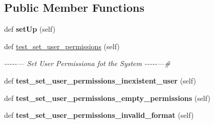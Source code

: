 \subsection*{Public Member Functions}
\begin{DoxyCompactItemize}
\item 
\mbox{\label{classtests_1_1test__11__user__set__permissions_1_1_test_user_routes_a5ea7fb6069f63faa57c138d73a687d7c}} 
def {\bfseries set\+Up} (self)
\item 
\mbox{\label{classtests_1_1test__11__user__set__permissions_1_1_test_user_routes_aeccf827afa3d453bc46799a18600bd29}} 
def \hyperlink{classtests_1_1test__11__user__set__permissions_1_1_test_user_routes_aeccf827afa3d453bc46799a18600bd29}{test\+\_\+set\+\_\+user\+\_\+permissions} (self)
\begin{DoxyCompactList}\small\item\em -\/-\/-\/-\/-\/--- Set User Permissiona fot the System -\/-\/-\/-\/-\/---\# \end{DoxyCompactList}\item 
\mbox{\label{classtests_1_1test__11__user__set__permissions_1_1_test_user_routes_abd6a4f49a136ac51321371ec480348bb}} 
def {\bfseries test\+\_\+set\+\_\+user\+\_\+permissions\+\_\+inexistent\+\_\+user} (self)
\item 
\mbox{\label{classtests_1_1test__11__user__set__permissions_1_1_test_user_routes_a98fc5eed433235fbb33160c459943078}} 
def {\bfseries test\+\_\+set\+\_\+user\+\_\+permissions\+\_\+empty\+\_\+permissions} (self)
\item 
\mbox{\label{classtests_1_1test__11__user__set__permissions_1_1_test_user_routes_a4aa0ecaebdd889d712187bc36d139c76}} 
def {\bfseries test\+\_\+set\+\_\+user\+\_\+permissions\+\_\+invalid\+\_\+format} (self)
\end{DoxyCompactItemize}

